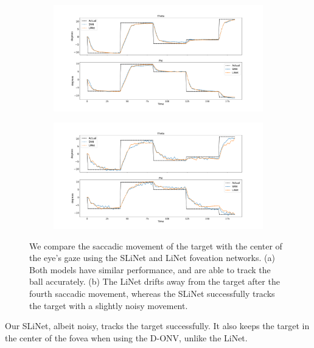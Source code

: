 \documentclass [MS] {UCLAthesis}
\begin{document}
\begin{figure}
    \centering

    \begin{subfigure}{\textwidth}
        \centering
        \includegraphics[width=\textwidth]{saccade_ori_normal}
        \caption{}
        \label{fig:saccade_normal}
    \end{subfigure}

    \begin{subfigure}{\textwidth}
        \centering
        \includegraphics[width=\textwidth]{saccade_ori_delta}
        \caption{}
        \label{fig:saccade_delta}
    \end{subfigure}

    \caption[Saccade eye orientation with different models]{We compare the saccadic movement of the target with the center of the eye's gaze using the SLiNet and LiNet foveation networks. (a) Both models have similar performance, and are able to track the ball accurately. (b) The LiNet drifts away from the target after the fourth saccadic movement, whereas the SLiNet successfully tracks the target with a slightly noisy movement.}
    \label{fig:saccade}
\end{figure}

Our SLiNet, albeit noisy, tracks the target successfully. It also keeps the target in the center of the fovea when using the D-ONV, unlike the LiNet.
\end{document}

